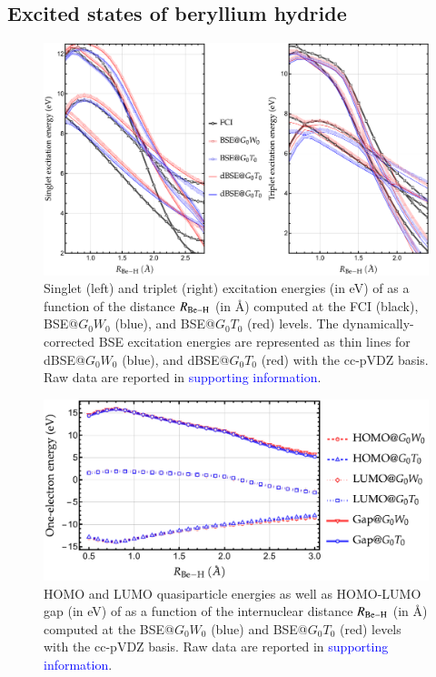 \documentclass[aip,jcp,reprint,noshowkeys,superscriptaddress]{revtex4-1}
\newcommand{\SupInf}{\textcolor{blue}{supporting information}}
\begin{document}
\subsection{Excited states of beryllium hydride}
\label{sec:beh2}

\begin{figure}
	\includegraphics[width=\textwidth]{BeH2}
	\caption{Singlet (left) and triplet (right) excitation energies (in \si{\eV}) of  as a function of the distance $R_{\ce{Be-H}}$ (in \si{\angstrom}) computed at the FCI (black), BSE@$G_0W_0$ (blue), and BSE@$G_0T_0$ (red) levels.
	The dynamically-corrected BSE excitation energies are represented as thin lines for dBSE@$G_0W_0$ (blue), and dBSE@$G_0T_0$ (red) with the cc-pVDZ basis.
	Raw data are reported in {\SupInf}.}
	\label{fig:BeH2}
\end{figure}

\begin{figure}
	\includegraphics[width=\linewidth]{BeH2_gap}
	\caption{HOMO and LUMO quasiparticle energies as well as HOMO-LUMO gap (in \si{\eV}) of  as a function of the internuclear distance $R_{\ce{Be-H}}$ (in \si{\angstrom}) computed at the BSE@$G_0W_0$ (blue) and BSE@$G_0T_0$ (red) levels with the cc-pVDZ basis.
	Raw data are reported in {\SupInf}.}
	\label{fig:BeH2_gap}
\end{figure}
\end{document}
